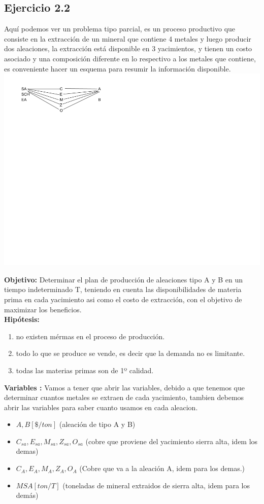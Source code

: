\documentclass[12pt]{book}
\begin{document}
\subsection{Ejercicio 2.2}
Aquí podemos ver un problema tipo parcial, es un proceso productivo que consiste en la extracción de un mineral que contiene 4 metales y luego producir dos aleaciones, la extracción está disponible en 3 yacimientos, y tienen un costo asociado y una composición diferente en lo respectivo a los metales que contiene, es conveniente hacer un esquema para resumir la información disponible.
\\
\includegraphics[scale=.9]{./img/IMG2-2.png}



\textbf{Objetivo: }Determinar el plan de producción de aleaciones tipo A y B en un tiempo indeterminado T, teniendo en cuenta las disponibilidades de materia prima en cada yacimiento asi como el costo de extracción, con el objetivo de maximizar los beneficios.
\\
\textbf{Hip\'otesis: }
\begin{enumerate}
\item no existen m\'ermas en el proceso de producci\'on.
\item todo lo que se produce se vende, es decir que la demanda no es limitante.
\item todas las materias primas son de 1º calidad.
\end{enumerate}

\textbf{Variables :}
Vamos a tener que abrir las variables, debido a que tenemos que determinar cuantos metales se extraen de cada yacimiento, tambien debemos abrir las variables para saber cuanto usamos en cada aleacion.
\begin{itemize}
\item $ A , B [\$/ton] $ (aleación de tipo A y B)
\item $ C_{sa}, E_{sa}, M_{sa}, Z_{sa}, O_{sa} $ (cobre que proviene del yacimiento sierra alta, idem los demas)
\item $ C_A, E_A, M_A, Z_A,O_A $ (Cobre que va a la aleación A, idem para los demas.)
\item $ MSA [ton /T] $ (toneladas de mineral extraidos de sierra alta, idem para los demás)
\end{itemize}
\end{document}
